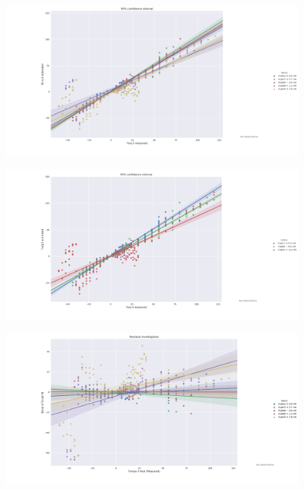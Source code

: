 \documentclass[12pt]{article}
\begin{document}
\begin{figure}[H]
\centering
\includegraphics[width=.9\textwidth]{images/round1/TorqX_hueX.png}
\end{figure}

\begin{figure}[H]
\centering
\includegraphics[width=.9\textwidth]{images/round1/TorqX_hueY.png}
\end{figure}


\begin{figure}[H]
\centering
\includegraphics[width=.9\textwidth]{images/round1/ResidX_hueX.png}
\end{figure}
\end{document}
